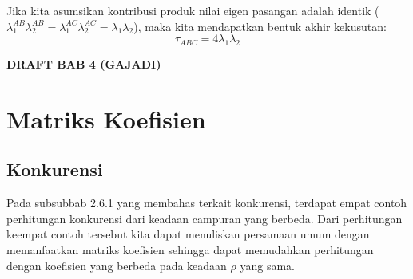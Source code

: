 Jika kita asumsikan kontribusi produk nilai eigen pasangan adalah identik ($\lambda_1^{AB}\lambda_2^{AB} = \lambda_1^{AC}\lambda_2^{AC} = \lambda_1\lambda_2$), maka kita mendapatkan bentuk akhir kekusutan:
\begin{equation*}
	\tau_{ABC} = 4 \lambda_1 \lambda_2
\end{equation*}












\textbf{DRAFT BAB 4 (GAJADI)}
\chapter{Matriks Koefisien}
\section{Konkurensi}
\par
Pada subsubbab 2.6.1 yang membahas terkait konkurensi, terdapat empat contoh perhitungan konkurensi dari keadaan campuran yang berbeda. Dari perhitungan keempat contoh tersebut kita dapat menuliskan persamaan umum dengan memanfaatkan matriks koefisien sehingga dapat memudahkan perhitungan dengan koefisien yang berbeda pada keadaan $\rho$ yang sama.
